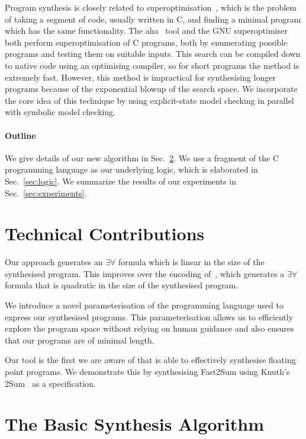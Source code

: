 \documentclass[a4paper]{llncs}
\begin{document}
Program synthesis is closely related to
superoptimisation~\cite{superoptimisation}, which is the problem of taking a
segment of code, usually written in C, and finding a minimal program which
has the same functionality.  The {\sc aha}~\cite{aha} tool and the GNU
superoptimiser~\cite{gnu-superoptimiser} both perform superoptimisation of C
programs, both by enumerating possible programs and testing them on suitable
inputs.  This search can be compiled down to native code using an optimising
compiler, so for short programs the method is extremely fast.  However, this
method is impractical for synthesising longer programs because of the
exponential blowup of the search space.  We incorporate the core idea of
this technique by using explicit-state model checking in parallel with
symbolic model checking.

\paragraph{Outline} We give details of our new algorithm in
Sec.~\ref{sec:algorithm}.  We use a fragment of the C programming language
as our underlying logic, which is elaborated in Sec.~\ref{sec:logic}. We
summarize the results of our experiments in Sec.~\ref{sec:experiments}.

\section{Technical Contributions}
Our approach generates an $\exists \forall$ formula which is linear
in the size of the synthesised program.  This improves over the
encoding of~\cite{brahma}, which generates a $\exists \forall$ formula
that is quadratic in the size of the synthesised program.

We introduce a novel parameterisation of the programming language
used to express our synthesised programs.
This parameterisation allows us to efficiently explore the program space
without relying on human guidance and also ensures that our programs
are of minimal length.

Our tool is the first we are aware of that is able to effectively
synthesise floating point programs.  We demonstrate this by
synthesising {\sc Fast2Sum} using Knuth's {\sc 2Sum}~\cite{taocp2} as
a specification.

\section{The Basic Synthesis Algorithm}
\label{sec:algorithm}
\end{document}
